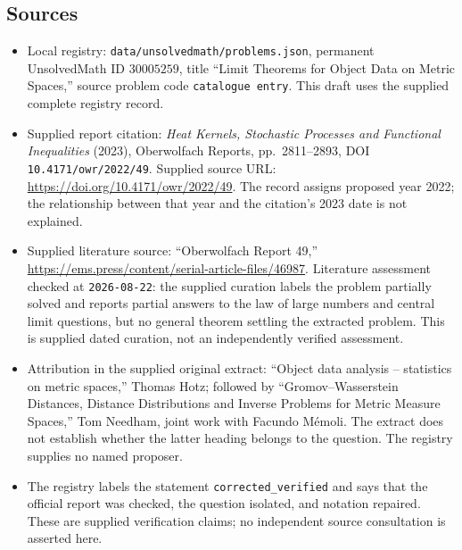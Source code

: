 \documentclass[11pt]{article}
\begin{document}
\subsection{Sources}
\begin{itemize}
\item Local registry: \texttt{data/unsolvedmath/problems.json}, permanent UnsolvedMath ID \(30005259\), title ``Limit Theorems for Object Data on Metric Spaces,'' source problem code \texttt{catalogue entry}. This draft uses the supplied complete registry record.
\item Supplied report citation: \emph{Heat Kernels, Stochastic Processes and Functional Inequalities} (2023), Oberwolfach Reports, pp.\ 2811--2893, DOI \texttt{10.4171/owr/2022/49}. Supplied source URL: \url{https://doi.org/10.4171/owr/2022/49}. The record assigns proposed year 2022; the relationship between that year and the citation's 2023 date is not explained.
\item Supplied literature source: ``Oberwolfach Report 49,'' \url{https://ems.press/content/serial-article-files/46987}. Literature assessment checked at \texttt{2026-08-22}: the supplied curation labels the problem partially solved and reports partial answers to the law of large numbers and central limit questions, but no general theorem settling the extracted problem. This is supplied dated curation, not an independently verified assessment.
\item Attribution in the supplied original extract: ``Object data analysis -- statistics on metric spaces,'' Thomas Hotz; followed by ``Gromov--Wasserstein Distances, Distance Distributions and Inverse Problems for Metric Measure Spaces,'' Tom Needham, joint work with Facundo M\'{e}moli. The extract does not establish whether the latter heading belongs to the question. The registry supplies no named proposer.
\item The registry labels the statement \texttt{corrected\_verified} and says that the official report was checked, the question isolated, and notation repaired. These are supplied verification claims; no independent source consultation is asserted here.
\end{itemize}
\end{document}

